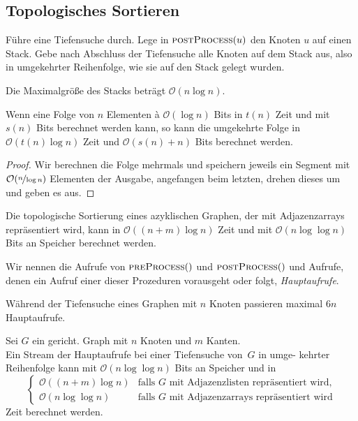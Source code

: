 \documentclass{cheat-sheet}
\renewcommand{\O}{\mathcal{O}} %
\begin{document}
\subsection{Topologisches Sortieren}

\begin{alg}
  Führe eine Tiefensuche durch.
  Lege in $\Call{postProcess}{u}$ den Knoten $u$ auf einen Stack.
  Gebe nach Abschluss der Tiefensuche alle Knoten auf dem Stack aus, also in umgekehrter Reihenfolge, wie sie auf den Stack gelegt wurden.
\end{alg}

\begin{problem}
  Die Maximalgröße des Stacks beträgt $\O(n \log n)$.
\end{problem}

\begin{lem}
  Wenn eine Folge von $n$ Elementen à $\O(\log n)$ Bits in $t(n)$ Zeit und mit $s(n)$ Bits berechnet werden kann, so kann die umgekehrte Folge in $\O(t(n) \log n)$ Zeit und $\O(s(n) + n)$ Bits berechnet werden.
\end{lem}

\begin{proof}
  Wir berechnen die Folge mehrmals und speichern jeweils ein Segment mit $\O(\nicefrac{n}{\log n})$ Elementen der Ausgabe, angefangen beim letzten, drehen dieses um und geben es aus.
\end{proof}

\begin{kor}
  Die topologische Sortierung eines azyklischen Graphen, der mit Adjazenzarrays repräsentiert wird, kann in $\O((n + m) \log n)$ Zeit und mit $\O(n \log \log n)$ Bits an Speicher berechnet werden.
\end{kor}

\begin{bezeichnung}
  Wir nennen die Aufrufe von $\Call{preProcess}$ und $\Call{postProcess}$ und Aufrufe, denen ein Aufruf einer dieser Prozeduren vorausgeht oder folgt, \textit{Hauptaufrufe}.
\end{bezeichnung}

\begin{bem}
  Während der Tiefensuche eines Graphen mit $n$ Knoten passieren maximal $6 n$ Hauptaufrufe.
\end{bem}

\begin{lem}
  Sei $G$ ein gericht. Graph mit $n$ Knoten und $m$ Kanten. \\
  Ein Stream der Hauptaufrufe bei einer Tiefensuche von~$G$ in umge- kehrter Reihenfolge kann mit $\O(n \log \log n)$ Bits an Speicher und in
  \[
    \begin{cases}
      \O((n+m) \log n) & \text{falls $G$ mit Adjazenzlisten repräsentiert wird,} \\
      \O(n \log \log n) & \text{falls $G$ mit Adjazenzarrays repräsentiert wird}
    \end{cases}
  \]
  Zeit berechnet werden.
\end{lem}
\end{document}
